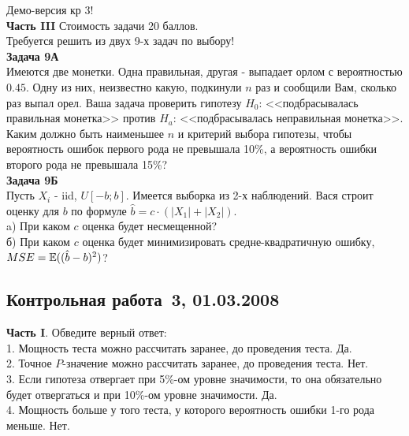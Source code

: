 \documentclass[pdftex,12pt,a4paper]{article}
\begin{document}
Демо-версия кр 3! \\
\textbf{Часть III} Стоимость задачи 20 баллов. \\

Требуется решить \textbf{} из двух 9-х задач по
выбору! \\

\textbf{Задача 9А} \\
Имеются две монетки. Одна правильная, другая - выпадает орлом с
вероятностью $0.45$. Одну из них, неизвестно какую, подкинули $n$
раз и сообщили Вам, сколько раз выпал орел. Ваша задача проверить
гипотезу $H_{0}$: <<подбрасывалась правильная монетка>> против
$H_{a}$:
<<подбрасывалась неправильная монетка>>. \\
Каким должно быть наименьшее $n$ и критерий выбора гипотезы, чтобы
вероятность ошибок первого рода не превышала 10\%, а вероятность
ошибки второго рода не превышала 15\%? \\

\textbf{Задача 9Б} \\
Пусть $X_{i}$ - iid, $U[-b;b]$. Имеется выборка из 2-х наблюдений. Вася строит оценку для $b$ по формуле $\hat{b}=c\cdot (|X_{1}|+|X_{2}|)$. \\
a) При каком $c$ оценка будет несмещенной? \\
б) При каком $c$ оценка будет минимизировать средне-квадратичную ошибку, $MSE=\mathbb{E}((\hat{b}-b)^{2})$? \\


\subsection{Контрольная работа \No\,3, 01.03.2008}

\textbf{Часть I}. Обведите верный ответ: \\

1. Мощность теста можно рассчитать заранее, до проведения теста. Да.  \\

2. Точное $P$-значение можно рассчитать заранее, до проведения теста. Нет. \\

3. Если гипотеза отвергает при 5\%-ом уровне значимости, то
она обязательно будет отвергаться и при 10\%-ом уровне значимости. Да. \\

4. Мощность больше у того теста, у которого вероятность ошибки
1-го рода меньше.  Нет. \\
\end{document}

